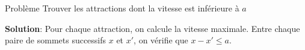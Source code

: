 \begin{frame}
    \frametitle{\problemtitle}
        \begin{block}
            {Problème} Trouver les attractions dont la vitesse est inférieure à $a$
        \end{block}
        \pause
        \textbf{Solution}: Pour chaque attraction, on calcule la vitesse maximale. Entre chaque paire de sommets successifs $x$ et $x'$, on vérifie que $x-x' \leq a$.
\end{frame}

